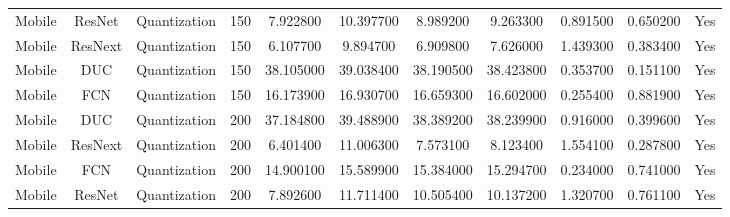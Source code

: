 \begin{tabular}{|c||c||c||c||c||c||c||c||c||c||c|}
Mobile & ResNet & Quantization & 150 & 7.922800 & 10.397700 & 8.989200 & 9.263300 & 0.891500 & 0.650200 & Yes \\
Mobile & ResNext & Quantization & 150 & 6.107700 & 9.894700 & 6.909800 & 7.626000 & 1.439300 & 0.383400 & Yes \\
Mobile & DUC & Quantization & 150 & 38.105000 & 39.038400 & 38.190500 & 38.423800 & 0.353700 & 0.151100 & Yes \\
Mobile & FCN & Quantization & 150 & 16.173900 & 16.930700 & 16.659300 & 16.602000 & 0.255400 & 0.881900 & Yes \\
Mobile & DUC & Quantization & 200 & 37.184800 & 39.488900 & 38.389200 & 38.239900 & 0.916000 & 0.399600 & Yes \\
Mobile & ResNext & Quantization & 200 & 6.401400 & 11.006300 & 7.573100 & 8.123400 & 1.554100 & 0.287800 & Yes \\
Mobile & FCN & Quantization & 200 & 14.900100 & 15.589900 & 15.384000 & 15.294700 & 0.234000 & 0.741000 & Yes \\
Mobile & ResNet & Quantization & 200 & 7.892600 & 11.711400 & 10.505400 & 10.137200 & 1.320700 & 0.761100 & Yes \\
\bottomrule
\end{tabular}
